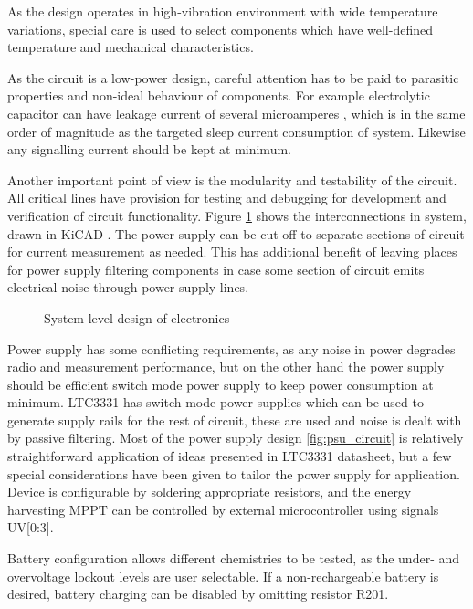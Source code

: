 As the design operates in high-vibration environment with wide temperature variations, special care is used to select components which have well-defined temperature and mechanical characteristics. 

As the circuit is a low-power design, careful attention has to be paid to parasitic properties and non-ideal behaviour of components. For example electrolytic capacitor can have leakage current of several microamperes \cite{Both2001}, which is in the same order of magnitude as the targeted sleep current consumption of system. Likewise any signalling current should be kept at minimum. 

Another important point of view is the modularity and testability of the circuit. All critical lines have provision for testing and debugging for development and verification of circuit functionality. Figure \ref{fig:circuit_blocklevel} shows the interconnections in system, drawn in KiCAD \cite{KiCAD}.  The power supply can be cut off to separate sections of circuit for current measurement as needed. This has additional benefit of leaving places for power supply filtering components in case some section of circuit emits electrical noise through power supply lines.

\begin{figure}
    \centering
    \def\svgwidth{\columnwidth}
    
    \caption{\label{fig:circuit_blocklevel} System level design of electronics}
\end{figure}

Power supply has some conflicting requirements, as any noise in power degrades radio and measurement performance, but on the other hand the power supply should be efficient switch mode power supply to keep power consumption at minimum. LTC3331 has switch-mode power supplies which can be used to generate supply rails for the rest of circuit, these are used and noise is dealt with by passive filtering. Most of the power supply design \ref{fig:psu_circuit} is relatively straightforward application of ideas presented in LTC3331 datasheet, but a few special considerations have been given to tailor the power supply for application. Device is configurable by soldering appropriate resistors, and the energy harvesting MPPT can be controlled by external microcontroller using signals UV[0:3]. 

Battery configuration allows different chemistries to be tested, as the under- and overvoltage lockout levels are user selectable. If a non-rechargeable battery is desired, battery charging can be disabled by omitting resistor R201. 

